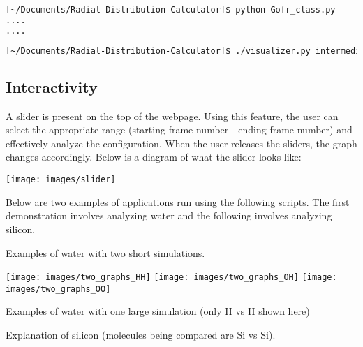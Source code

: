 \begin{lstlisting}[language=bash, caption=Running the script.]
[~/Documents/Radial-Distribution-Calculator]$ python Gofr_class.py
....
....
\end{lstlisting}



\begin{lstlisting}[language=bash, caption=Running the script.]
[~/Documents/Radial-Distribution-Calculator]$ ./visualizer.py intermediate_files/cum_counts.txt intermediate_files/cum_counts2.txt 
\end{lstlisting}


\subsection*{Interactivity}

A slider is present on the top of the webpage. Using this feature, the user can select the appropriate range (starting frame number - ending frame number) and effectively analyze the configuration. When the user releases the sliders, the graph changes accordingly. Below is a diagram of what the slider looks like:




\texttt{[image: images/slider]}



Below are two examples of applications run using the following scripts. The first demonstration involves analyzing water and the following involves analyzing silicon. 



Examples of water with two short simulations.

\texttt{[image: images/two\_graphs\_HH]}
\texttt{[image: images/two\_graphs\_OH]}
\texttt{[image: images/two\_graphs\_OO]}



Examples of water with one large simulation (only H vs H shown here)




Explanation of silicon (molecules being compared are Si vs Si).


